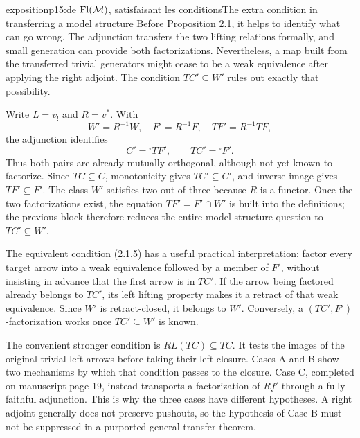 \begin{dcomment}{exposition}{p15:de $\mathrm{Fl}(\mathcal{M})$, satisfaisant les conditions}{The extra condition in transferring a model structure}
Before Proposition 2.1, it helps to identify what can go wrong. The adjunction transfers the two lifting relations formally, and small generation can provide both factorizations. Nevertheless, a map built from the transferred trivial generators might cease to be a weak equivalence after applying the right adjoint. The condition $TC'\subseteq W'$ rules out exactly that possibility.

Write $L=v_!$ and $R=v^*$. With
\[
 W'=R^{-1}W,\quad F'=R^{-1}F,\quad
 TF'=R^{-1}TF,
\]
the adjunction identifies
\[
 C'={}^{\square}TF',\qquad TC'={}^{\square}F'.
\]
Thus both pairs are already mutually orthogonal, although not yet known to factorize. Since $TC\subseteq C$, monotonicity gives $TC'\subseteq C'$, and inverse image gives $TF'\subseteq F'$. The class $W'$ satisfies two-out-of-three because $R$ is a functor. Once the two factorizations exist, the equation $TF'=F'\cap W'$ is built into the definitions; the previous block therefore reduces the entire model-structure question to $TC'\subseteq W'$.

The equivalent condition (2.1.5) has a useful practical interpretation: factor every target arrow into a weak equivalence followed by a member of $F'$, without insisting in advance that the first arrow is in $TC'$. If the arrow being factored already belongs to $TC'$, its left lifting property makes it a retract of that weak equivalence. Since $W'$ is retract-closed, it belongs to $W'$. Conversely, a $(TC',F')$-factorization works once $TC'\subseteq W'$ is known.

The convenient stronger condition is $RL(TC)\subseteq TC$. It tests the images of the original trivial left arrows before taking their left closure. Cases A and B show two mechanisms by which that condition passes to the closure. Case C, completed on manuscript page 19, instead transports a factorization of $Rf'$ through a fully faithful adjunction. This is why the three cases have different hypotheses. A right adjoint generally does not preserve pushouts, so the hypothesis of Case B must not be suppressed in a purported general transfer theorem.
\end{dcomment}



